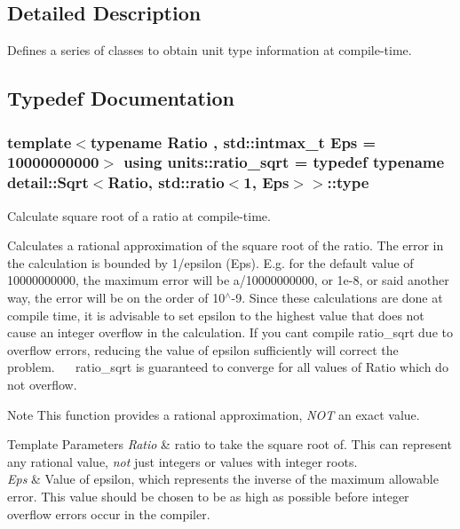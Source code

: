 \subsection{Detailed Description}
Defines a series of classes to obtain unit type information at compile-\/time. 



\subsection{Typedef Documentation}
\hypertarget{group___type_traits_ga62dd90a825a801e3e29841ed51713693}{}
\subsubsection[{ratio\+\_\+sqrt}]{\setlength{\rightskip}{0pt plus 5cm}template$<$typename Ratio , std\+::intmax\+\_\+t Eps = 10000000000$>$ using {\bf units\+::ratio\+\_\+sqrt} = typedef typename detail\+::\+Sqrt$<$Ratio, std\+::ratio$<$1, Eps$>$$>$\+::type}\label{group___type_traits_ga62dd90a825a801e3e29841ed51713693}


Calculate square root of a ratio at compile-\/time. 

Calculates a rational approximation of the square root of the ratio. The error in the calculation is bounded by 1/epsilon (Eps). E.\+g. for the default value of 10000000000, the maximum error will be a/10000000000, or 1e-\/8, or said another way, the error will be on the order of 10$^\wedge$-\/9. Since these calculations are done at compile time, it is advisable to set epsilon to the highest value that does not cause an integer overflow in the calculation. If you can\textquotesingle{}t compile {\ttfamily ratio\+\_\+sqrt} due to overflow errors, reducing the value of epsilon sufficiently will correct the problem.~\newline
~\newline
 {\ttfamily ratio\+\_\+sqrt} is guaranteed to converge for all values of {\ttfamily Ratio} which do not overflow. \begin{DoxyNote}{Note}
This function provides a rational approximation, {\itshape N\+O\+T} an exact value. 
\end{DoxyNote}

\begin{DoxyTemplParams}{Template Parameters}
{\em Ratio} & ratio to take the square root of. This can represent any rational value, {\itshape not} just integers or values with integer roots. \\
\hline
{\em Eps} & Value of epsilon, which represents the inverse of the maximum allowable error. This value should be chosen to be as high as possible before integer overflow errors occur in the compiler. \\
\hline
\end{DoxyTemplParams}
